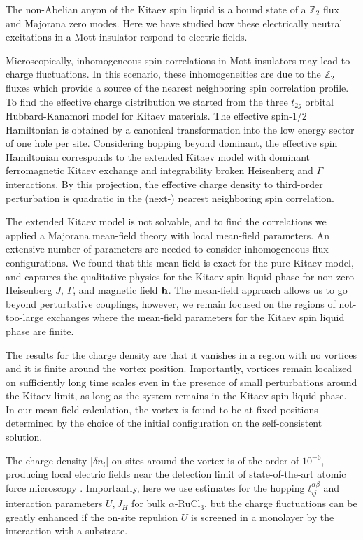
The non-Abelian anyon of the Kitaev spin liquid is a bound state of a $\mathbb{Z}_2$ flux and Majorana zero modes.  Here we have studied how these electrically neutral excitations in a Mott insulator respond to electric fields.

Microscopically, inhomogeneous spin correlations in Mott insulators may lead to charge fluctuations. In this scenario, these inhomogeneities are due to the $\mathbb{Z}_2$ fluxes which provide a source of the nearest neighboring spin correlation profile. To find the effective charge distribution we started from the three $t_{2g}$ orbital Hubbard-Kanamori model for Kitaev materials.  The effective spin-1/2 Hamiltonian is obtained by a canonical transformation into the low energy sector of one hole per site. Considering hopping beyond dominant, the effective spin Hamiltonian corresponds to the extended Kitaev model with dominant ferromagnetic Kitaev exchange and integrability broken Heisenberg and $\Gamma$ interactions. By this projection, the effective charge density to third-order perturbation is quadratic in the (next-) nearest neighboring spin correlation.

The extended Kitaev model is not solvable, and to find the correlations we applied a Majorana mean-field theory with local mean-field parameters. An extensive number of parameters are needed to consider inhomogeneous flux configurations. We found that this mean field is exact for the pure Kitaev model, and captures the qualitative physics for the Kitaev spin liquid phase for non-zero Heisenberg $J$, $\Gamma$, and magnetic field $\mathbf h$.  The mean-field approach allows us to go beyond perturbative couplings, however, we remain focused on the regions of not-too-large exchanges where the mean-field parameters for the Kitaev spin liquid phase are finite.

The results for the charge density are that it vanishes in a region with no vortices and it is finite around the vortex position. Importantly, vortices remain localized on sufficiently long time scales even in the presence of small perturbations around the Kitaev limit, as long as the system remains in the Kitaev spin liquid phase.
In our mean-field calculation, the vortex is found to be at fixed positions determined by the choice of the initial configuration on the self-consistent solution.


The charge density $|\delta n_l|$ on sites around the vortex is of the order of $10^{-6}$,  producing local electric fields near the detection limit of state-of-the-art atomic force microscopy \cite{Pereira2020,Wagner2019,Bian2021,Yin2021}. Importantly, here we use estimates for the hopping $t^{\alpha\beta}_{ij}$ and interaction parameters $U, J_H$ for bulk $\alpha$-RuCl$_3$, but the charge fluctuations can be greatly enhanced if the on-site repulsion $U$ is screened in a monolayer by the interaction with a substrate.



